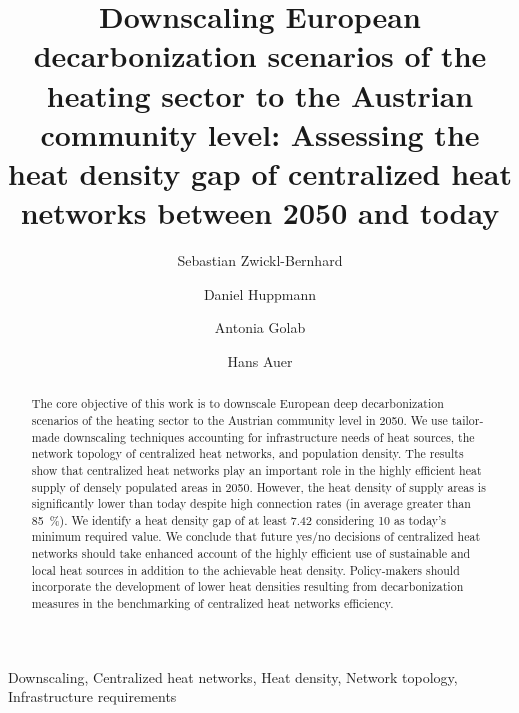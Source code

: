 \documentclass[review]{elsarticle}
\begin{document}
\begin{frontmatter}

\title{Downscaling European decarbonization scenarios of the heating sector to the Austrian community level: Assessing the heat density gap of centralized heat networks between 2050 and today}
\author[1,2]{Sebastian Zwickl-Bernhard}
\author[2]{Daniel Huppmann}
\author[1]{Antonia Golab}
\author[1]{Hans Auer}
\address[1]{Energy Economics Group (EEG), Technische Universität Wien, Gusshausstrasse 25-29/E370-3, 1040 Wien, Austria}
\address[2]{Energy, Climate and Environment (ECE) Program,  International Institute for Applied Systems Analysis (IIASA), Laxenburg, Austria}

\begin{abstract}
	The core objective of this work is to downscale European deep decarbonization scenarios of the heating sector to the Austrian community level in 2050. We use tailor-made downscaling techniques accounting for infrastructure needs of heat sources, the network topology of centralized heat networks, and population density. The results show that centralized heat networks play an important role in the highly efficient heat supply of densely populated areas in 2050. However, the heat density of supply areas is significantly lower than today despite high connection rates (in average greater than \SI{85}{\%}). We identify a heat density gap of at least \SI{7.42}{} considering \SI{10}{} as today's minimum required value. We conclude that future yes/no decisions of centralized heat networks should take enhanced account of the highly efficient use of sustainable and local heat sources in addition to the achievable heat density. Policy-makers should incorporate the development of lower heat densities resulting from decarbonization measures in the benchmarking of centralized heat networks efficiency.  
\end{abstract}

\begin{keyword}
	Downscaling, Centralized heat networks, Heat density, Network topology, Infrastructure requirements
\end{keyword}
\end{frontmatter}

\linenumbers

\newpage

\newpage

\newpage

\end{document}
